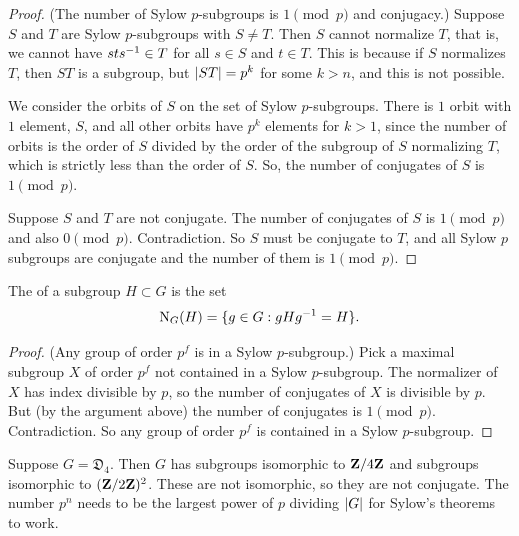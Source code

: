 \documentclass[11pt, twoside]{amsart}
\begin{document}
\begin{proof}
(The number of Sylow $p$-subgroups is $1\pmod p$ and conjugacy.)  Suppose $S$ and $T$ are Sylow $p$-subgroups with $S\neq T$. Then $S$ cannot normalize $T$, that is, we cannot have $sts^{-1} \in T$ for all $s\in S$ and $t\in T$. This is because if $S$ normalizes $T$, then $ST$ is a subgroup, but $\left \lvert ST \right \rvert = p^k$ for some $k>n$, and this is not possible. 

We consider the orbits of $S$ on the set of Sylow $p$-subgroups. There is $1$ orbit with $1$ element, $S$, and all other orbits have $p^k$ elements for $k>1$, since the number of orbits is the order of $S$ divided by the order of the subgroup of $S$ normalizing $T$, which is strictly less than the order of $S$. So, the number of conjugates of $S$ is $1\pmod p$.

Suppose $S$ and $T$ are not conjugate. The number of conjugates of $S$ is $1\pmod p$ and also $0\pmod p$. Contradiction. %
So $S$ must be conjugate to $T$, and all Sylow $p$ subgroups are conjugate and the number of them is $1\pmod p$.
\end{proof}

\begin{definition}
The  of a subgroup $H\subset G$ is the set
$$
\operatorname{N}_G(H) = \{ g\in G : gHg^{-1} = H\}.
$$ 
\end{definition}
\begin{proof}
(Any group of order $p^f$ is in a Sylow $p$-subgroup.) Pick a maximal subgroup $X$ of order $p^f$ not contained in a Sylow $p$-subgroup. The normalizer of $X$ has index divisible by $p$, so the number of conjugates of $X$ is divisible by $p$. But (by the argument above) the number of conjugates is $1\pmod p$. Contradiction. So any group of order $p^f$ is contained in a Sylow $p$-subgroup.
\end{proof}

\begin{example}
Suppose $G = \mathfrak{D}_4$. Then $G$ has subgroups isomorphic to $\mathbf{Z}/4\mathbf{Z}$ and subgroups isomorphic to $(\mathbf{Z}/2\mathbf{Z})^2$. These are not isomorphic, so they are not conjugate. The number $p^n$ needs to be the largest power of $p$ dividing $\left \lvert G \right \rvert$ for Sylow's theorems to work.
\end{example}
\end{document}

